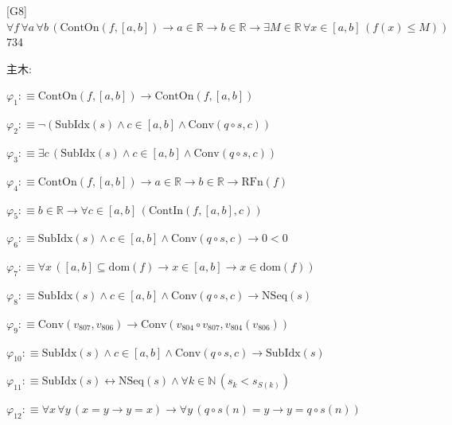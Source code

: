 \begin{fullproof}{[G8]}{$\forall f\,\forall a\,\forall b\,(\mathrm{ContOn}(f,[a,b]) \to a \in \mathbb{R} \to b \in \mathbb{R} \to \exists M \in \mathbb{R}\,\forall x \in [a,b]\,(f(x) \leq M))$}{734}
\begin{ptree}
\end{ptree}
\noindent 主木:
\begin{ptree}
\noLine
{}
\noLine
{}
\end{ptree}
\begin{abbrevlist}
\item $\varphi_{1} :\equiv \mathrm{ContOn}(f,[a,b]) \to \mathrm{ContOn}(f,[a,b])$
\item $\varphi_{2} :\equiv \neg (\mathrm{SubIdx}(s) \land c \in [a,b] \land \mathrm{Conv}(q \circ s,c))$
\item $\varphi_{3} :\equiv \exists c\,(\mathrm{SubIdx}(s) \land c \in [a,b] \land \mathrm{Conv}(q \circ s,c))$
\item $\varphi_{4} :\equiv \mathrm{ContOn}(f,[a,b]) \to a \in \mathbb{R} \to b \in \mathbb{R} \to \mathrm{RFn}(f)$
\item $\varphi_{5} :\equiv b \in \mathbb{R} \to \forall c \in [a,b]\,(\mathrm{ContIn}(f,[a,b],c))$
\item $\varphi_{6} :\equiv \mathrm{SubIdx}(s) \land c \in [a,b] \land \mathrm{Conv}(q \circ s,c) \to 0 < 0$
\item $\varphi_{7} :\equiv \forall x\,([a,b] \subseteq \mathrm{dom}(f) \to x \in [a,b] \to x \in \mathrm{dom}(f))$
\item $\varphi_{8} :\equiv \mathrm{SubIdx}(s) \land c \in [a,b] \land \mathrm{Conv}(q \circ s,c) \to \mathrm{NSeq}(s)$
\item $\varphi_{9} :\equiv \mathrm{Conv}(v_{807},v_{806}) \to \mathrm{Conv}(v_{804} \circ v_{807},v_{804}(v_{806}))$
\item $\varphi_{10} :\equiv \mathrm{SubIdx}(s) \land c \in [a,b] \land \mathrm{Conv}(q \circ s,c) \to \mathrm{SubIdx}(s)$
\item $\varphi_{11} :\equiv \mathrm{SubIdx}(s) \leftrightarrow \mathrm{NSeq}(s) \land \forall k \in \mathbb{N}\,(s_{k} < s_{S(k)})$
\item $\varphi_{12} :\equiv \forall x\,\forall y\,(x = y \to y = x) \to \forall y\,(q \circ s(n) = y \to y = q \circ s(n))$

\end{abbrevlist}
\end{fullproof}
